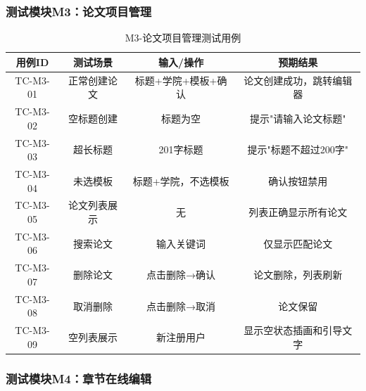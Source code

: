 \subsubsection{测试模块M3：论文项目管理}

\begin{table}[htbp]
    \centering
    \caption{M3-论文项目管理测试用例}
    \begin{tabular}{|c|c|c|c|}
        \hline
        \textbf{用例ID} & \textbf{测试场景} & \textbf{输入/操作} & \textbf{预期结果} \\
        \hline
        TC-M3-01 & 正常创建论文 & 标题+学院+模板+确认 & 论文创建成功，跳转编辑器 \\
        \hline
        TC-M3-02 & 空标题创建 & 标题为空 & 提示"请输入论文标题" \\
        \hline
        TC-M3-03 & 超长标题 & 201字标题 & 提示"标题不超过200字" \\
        \hline
        TC-M3-04 & 未选模板 & 标题+学院，不选模板 & 确认按钮禁用 \\
        \hline
        TC-M3-05 & 论文列表展示 & 无 & 列表正确显示所有论文 \\
        \hline
        TC-M3-06 & 搜索论文 & 输入关键词 & 仅显示匹配论文 \\
        \hline
        TC-M3-07 & 删除论文 & 点击删除→确认 & 论文删除，列表刷新 \\
        \hline
        TC-M3-08 & 取消删除 & 点击删除→取消 & 论文保留 \\
        \hline
        TC-M3-09 & 空列表展示 & 新注册用户 & 显示空状态插画和引导文字 \\
        \hline
    \end{tabular}
\end{table}

\subsubsection{测试模块M4：章节在线编辑}

